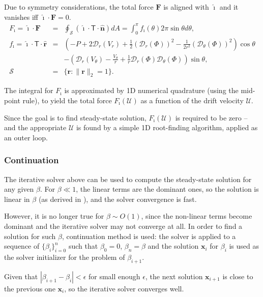 \documentclass[final]{elsarticle}
\newcommand\eps \epsilon
\newcommand{\pars}[1]{\left(#1\right)}
\newcommand\bF{\boldsymbol{F}}
\newcommand\bx{\boldsymbol{x}}
\newcommand\br{\boldsymbol{r}}
\newcommand\brhat{\hat{\br}}
\newcommand\bnhat{\hat{\boldsymbol{n}}}
\newcommand\cD{\mathcal{D}}
\newcommand\cU{\mathscr{U}}
\newcommand\tT{\mathsf{T}}
\newcommand\ui{\boldsymbol{\hat{\imath}}}
\begin{document}
Due to symmetry considerations, the total force $\bF$ is 
aligned with $\ui$ and it vanishes iff $\ui \cdot \bF = 0$.
\begin{eqnarray*}
F_\imath = \ui \cdot \bF &=& 
\oint_\mathcal{S} \pars{\ui \cdot \tT \cdot \bnhat} dA = 
\int_0^\pi f_\imath(\theta) 2\pi \sin\theta d\theta ,
\\  
f_\imath = \ui \cdot \tT \cdot \brhat &=& \pars{-P + 2\cD_r(V_r) + 
\frac{1}{2}\pars{\cD_r(\varPhi)}^2 - \frac{1}{2r^2}\pars{\cD_\theta(\varPhi)}^2}\cos\theta 
\\  
&& -\pars{\cD_r(V_\theta) - \frac{V_\theta}{r}
+ \frac{1}{r}\cD_r(\varPhi) \cD_{\theta}(\varPhi)}\sin\theta, \\
 \mathcal{S} &=& \{\br : \|\br\|_2 = 1\}.
\end{eqnarray*}

The integral for $F_\imath$ is approximated by 1D numerical quadrature
(using the mid-point rule), to yield 
the total force $F_\imath(\cU)$ as a function of the drift velocity $\cU$.

Since the goal is to find steady-state solution, $F_\imath(\cU)$ 
is required to be zero --
and the appropriate $\cU$ is found by a simple 1D root-finding algorithm,
applied as an outer loop.

\subsubsection{Continuation}

The iterative solver above can be used to compute the steady-state solution for any given $\beta$.
For $\beta \ll 1$, the linear terms are the dominant ones, so the solution is linear in $\beta$ 
(as derived in \cite{yariv2010migration}), and the solver convergence is fast.

However, it is no longer true for $\beta \sim O(1)$, since the non-linear terms become dominant
and the iterative solver may not converge at all.
In order to find a solution for such $\beta$, continuation method is used:
the solver is applied to a sequence of $\{\beta_i\}_{i=0}^n$ such that $\beta_0 = 0$,
$\beta_n = \beta$ and the solution $\bx_i$ for $\beta_i$ is used as the solver initializer
for the problem of $\beta_{i+1}$.

Given that $|\beta_{i+1} - \beta_i| < \eps$ for small enough $\eps$, 
the next solution $\bx_{i+1}$ is close to the previous one $\bx_i$,
so the iterative solver converges well.

\end{document}
